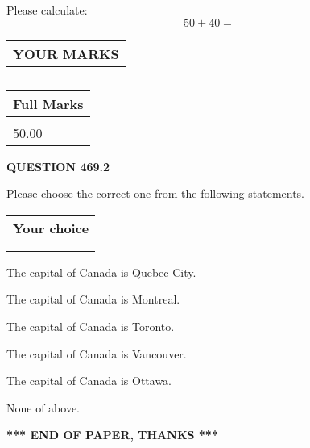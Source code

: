 \documentclass[12pt]{article}
\begin{document}
  
 
Please calculate:
\begin{equation}
50 +  %
40 = \nonumber
\end{equation}
 

 

 
  
\vspace{0.2in}
  
\noindent\begin{tabular}{|l|}
\hline
 YOUR MARKS  \\
\hline
 \\ 
 \\ 
\hline
\end{tabular}
\hspace{0.05in} \begin{tabular}{|l|}
\hline
 Full Marks  \\
\hline
 \\ 
50.00 \\
\hline
\end{tabular}
{\textbf{\Large{QUESTION
469.2 
}}}
  
  
Please choose the correct one from the following statements.
  
  
\noindent\hspace{3.0in} \begin{tabular}{|l|}
\hline
Your choice \\
\hline
 \\ 
 \\ 
\hline
\end{tabular}
  
  
 
 
The capital of Canada is Quebec City.
 
 
The capital of Canada is Montreal.
 
 
The capital of Canada is Toronto.
 
 
The capital of Canada is Vancouver.
 
 
The capital of Canada is Ottawa.
 
 
 None of above.
 
 
   
   
 \vspace{0.2in}
 
   
   
   
   
\vspace{1.0in} 
{\textbf{\large{ *** END OF PAPER, THANKS *** }}} 
   
\end{document}
